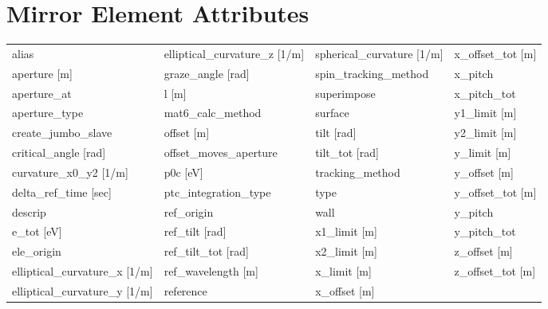  \vfill
 
 \section{Mirror Element Attributes}
 \label{s:list.mirror}
 
 \begin{tabular}{llll} \toprule
alias                            & elliptical_curvature_z [1/m]     & spherical_curvature [1/m]        & x_offset_tot [m]                 \\
aperture [m]                     & graze_angle [rad]                & spin_tracking_method             & x_pitch                          \\
aperture_at                      & l [m]                            & superimpose                      & x_pitch_tot                      \\
aperture_type                    & mat6_calc_method                 & surface                          & y1_limit [m]                     \\
create_jumbo_slave               & offset [m]                       & tilt [rad]                       & y2_limit [m]                     \\
critical_angle [rad]             & offset_moves_aperture            & tilt_tot [rad]                   & y_limit [m]                      \\
curvature_x0_y2 [1/m]            & p0c [eV]                         & tracking_method                  & y_offset [m]                     \\
delta_ref_time [sec]             & ptc_integration_type             & type                             & y_offset_tot [m]                 \\
descrip                          & ref_origin                       & wall                             & y_pitch                          \\
e_tot [eV]                       & ref_tilt [rad]                   & x1_limit [m]                     & y_pitch_tot                      \\
ele_origin                       & ref_tilt_tot [rad]               & x2_limit [m]                     & z_offset [m]                     \\
elliptical_curvature_x [1/m]     & ref_wavelength [m]               & x_limit [m]                      & z_offset_tot [m]                 \\
elliptical_curvature_y [1/m]     & reference                        & x_offset [m]                     &                                  \\
 \bottomrule
 \end{tabular}
 \vfill
 
